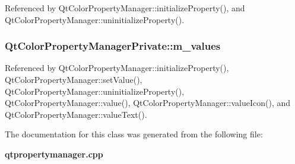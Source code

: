 Referenced by Qt\+Color\+Property\+Manager\+::initialize\+Property(), and Qt\+Color\+Property\+Manager\+::uninitialize\+Property().

\subsubsection[{m\+\_\+values}]{ Qt\+Color\+Property\+Manager\+Private\+::m\+\_\+values}\label{classQtColorPropertyManagerPrivate_af758f6f4a5bdac5f9bd693ba021c1814}


Referenced by Qt\+Color\+Property\+Manager\+::initialize\+Property(), Qt\+Color\+Property\+Manager\+::set\+Value(), Qt\+Color\+Property\+Manager\+::uninitialize\+Property(), Qt\+Color\+Property\+Manager\+::value(), Qt\+Color\+Property\+Manager\+::value\+Icon(), and Qt\+Color\+Property\+Manager\+::value\+Text().



The documentation for this class was generated from the following file\+:\begin{DoxyCompactItemize}
\item 
{\bf qtpropertymanager.\+cpp}\end{DoxyCompactItemize}
